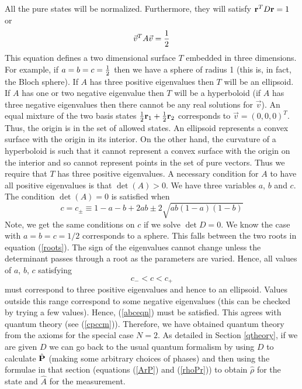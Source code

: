 \documentclass[10pt,twocolumn]{article}
\begin{document}
All the pure states will be normalized.
Furthermore, they will satisfy ${\bf r}^TD{\bf r}=1$ or
\begin{equation}
\vec{v}^T A \vec{v} = {1\over 2}
\end{equation}
This equation defines a two dimensional surface $T$ embedded in three
dimensions.  For example, if $a=b=c={1\over 2}$ then we have a sphere of
radius 1 (this is, in fact, the Bloch sphere).  If $A$ has three positive
eigenvalues then $T$ will be an ellipsoid.  If $A$ has one or two negative
eigenvalue then $T$ will be a hyperboloid (if
$A$ has three negative eigenvalues then there cannot be any real
solutions for $\vec{v}$). An equal mixture of the two basis
states ${1\over 2} {\bf r}_1 +{1\over 2}{\bf r}_2$ corresponds to
$\vec{v}=(0,0,0)^T$.  Thus, the origin is in the set of allowed states.
An ellipsoid represents a convex surface with the origin in its
interior.  On the other hand, the curvature of a hyperboloid is such
that it cannot represent a convex surface with the origin on the
interior and so cannot represent points in the set of pure
vectors.  Thus we require that $T$ has three positive eigenvalues.   A
necessary condition for $A$ to have all
positive eigenvalues is that $\det(A) > 0$.  We have three variables
$a$, $b$ and $c$.  The condition $\det(A)=0$ is satisfied when
\begin{equation}\label{roots}
c=c_{\pm}\equiv 1-a-b+2ab \pm 2\sqrt{ab(1-a)(1-b)}
\end{equation}
Note, we get the same conditions on $c$ if we solve $\det{D}=0$.
We know the case with $a=b=c=1/2$ corresponds to a sphere.  This falls
between the two roots in equation (\ref{roots}).  The sign of the
eigenvalues cannot change unless the determinant passes through a root
as the parameters are varied.  Hence, all values of $a$, $b$, $c$
satisfying
\begin{equation}\label{abceqn}
c_{-}< c < c_{+}
\end{equation}
must correspond to three positive eigenvalues and hence to an ellipsoid.
Values outside this range correspond to some negative eigenvalues (this
can be checked by trying a few values).  Hence, (\ref{abceqn}) must be
satisfied. This agrees with quantum theory (see (\ref{cpccm})).
Therefore, we have obtained
quantum theory from the axioms for the special case $N=2$.
As detailed in Section \ref{qtheory}, if we are given $D$ we can go back to the
usual quantum formalism by using $D$ to calculate $\hat{\bf P}$ (making
some arbitrary choices of phases) and then using the formulae in that
section (equations (\ref{ArP}) and (\ref{rhoPr}))
to obtain $\hat{\rho}$ for the state and $\hat{A}$ for the
measurement.
\end{document}
